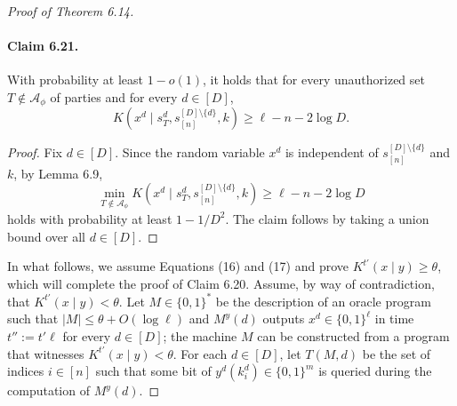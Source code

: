 \documentclass[10pt,a4paper]{article}
\begin{document}
\begin{proof}[Proof of Theorem 6.14]
\paragraph{Claim 6.21.}
With probability at least $1-o(1)$, it holds that for every unauthorized set $T\notin\mathcal A_\phi$ of parties and for every $d\in[D]$,
\[K(x^d\mid s_T^d,s_{[n]}^{[D]\setminus\{d\}},k)\geq\ell-n-2\log D.\tag{17}\]
\begin{proof}
Fix $d\in[D]$. Since the random variable $x^d$ is independent of $s_{[n]}^{[D]\setminus\{d\}}$ and $k$, by Lemma 6.9,
\[\min_{T\notin\mathcal A_\phi}K(x^d\mid s_T^d,s_{[n]}^{[D]\setminus\{d\}},k)\geq\ell-n-2\log D\]
holds with probability at least $1-1/D^2$. The claim follows by taking a union bound over all $d\in[D]$.
\end{proof}
In what follows, we assume Equations (16) and (17) and prove $K^{t'}(x\mid y)\geq\theta$, which will complete the proof of Claim 6.20. Assume, by way of contradiction, that $K^{t'}(x\mid y)<\theta$. Let $M\in\{0,1\}^*$ be the description of an oracle program such that $|M|\leq\theta+O(\log\ell)$ and $M^y(d)$ outputs $x^d\in\{0,1\}^\ell$ in time $t'':=t'\ell$ for every $d\in[D]$; the machine $M$ can be constructed from a program that witnesses $K^{t'}(x\mid y)<\theta$. For each $d\in[D]$, let $T(M,d)$ be the set of indices $i\in[n]$ such that some bit of $y^d(k_i^d)\in\{0,1\}^m$ is queried during the computation of $M^y(d)$.

\end{proof}
\end{document}
